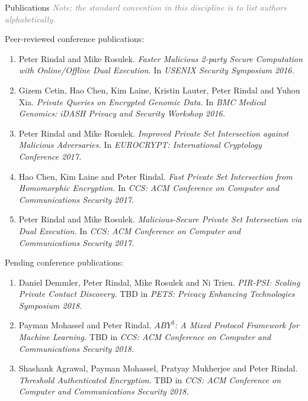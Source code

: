 \documentclass{resume} %
\begin{document}
\begin{rSection}{Publications}
\hfill {\scriptsize \textcolor{gray}{\emph{Note: the standard convention in this discipline is to list authors alphabetically.}}}

Peer-reviewed conference publications:
\begin{enumerate}[label=C\arabic* --]
	
	\item Peter Rindal and Mike Rosulek. \emph{Faster Malicious 2-party Secure Computation with Online/Offline Dual Execution.} In \emph{USENIX Security Symposium 2016.}
	
	\item Gizem Cetin, Hao Chen, Kim Laine, Kristin Lauter, Peter Rindal and Yuhou Xia. \emph{Private Queries on Encrypted Genomic Data.} In \emph{BMC Medical Genomics:  iDASH Privacy and Security Workshop 2016.}
		
	\item Peter Rindal and Mike Rosulek. \emph{Improved Private Set Intersection against Malicious Adversaries.} In \emph{EUROCRYPT: International Cryptology Conference 2017.}
	
	\item Hao Chen, Kim Laine and Peter Rindal. \emph{Fast Private Set Intersection from Homomorphic Encryption.} In \emph{CCS: ACM Conference on Computer and Communications Security 2017.}
	
	\item Peter Rindal and Mike Rosulek. \emph{Malicious-Secure Private Set Intersection via Dual Execution.} In \emph{CCS: ACM Conference on Computer and Communications Security 2017.}
\end{enumerate}

\bigskip 

Pending conference publications:
\begin{enumerate}[label=*C\arabic* --]
	
	
	\item Daniel Demmler, Peter Rindal, Mike Rosulek and Ni Trieu. \emph{PIR-PSI: Scaling Private Contact Discovery.} TBD in \emph{PETS: Privacy Enhancing Technologies Symposium 2018.}
	
	\item Payman Mohassel and Peter Rindal. \emph{$ABY^3$: A Mixed Protocol Framework for Machine Learning.} TBD in \emph{CCS: ACM Conference on Computer and Communications Security 2018.}
	
	\item Shashank Agrawal, Payman Mohassel, Pratyay Mukherjee and Peter Rindal. \emph{Threshold Authenticated Encryption}. TBD in \emph{CCS: ACM Conference on Computer and Communications Security 2018.}


\end{enumerate}
\end{rSection}
\end{document}
